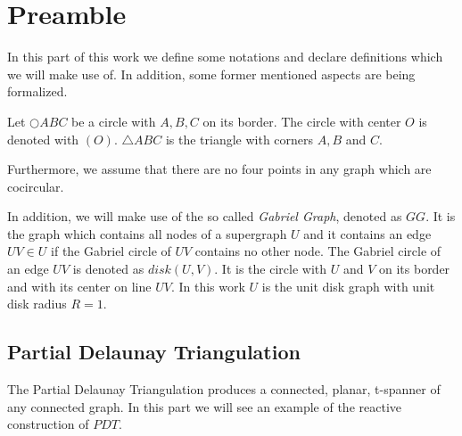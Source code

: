 \section{Preamble}
In this part of this work we define some notations and declare definitions which we will make use of.
In addition, some former mentioned aspects are being formalized.
 
Let $\bigcirc{ABC} $ be a circle with $A, B, C $ on its border.
The circle with center $O $ is denoted with $(O) $.
$\triangle{ABC} $ is the triangle with corners $A,B $ and $C $.

Furthermore, we assume that there are no four points in any graph which are cocircular.

In addition, we will make use of the so called \emph{Gabriel Graph}, denoted as $GG $. 
It is the graph which contains all nodes of a supergraph $U $ and it contains an edge $UV \in U $ if the Gabriel circle of $UV $ contains no other node.
The Gabriel circle of an edge $UV $ is denoted as $disk(U, V) $.
It is the circle with $U $ and $V $ on its border and with its center on line $UV $. 
In this work $U $ is the unit disk graph with unit disk radius $R = 1 $.

\subsection{Partial Delaunay Triangulation}
The Partial Delaunay Triangulation produces a connected, planar, t-spanner of any connected graph.
In this part we will see an example of the reactive construction of $PDT $.

